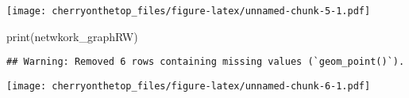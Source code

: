 \documentclass[
]{article}
\newenvironment{Shaded}{\begin{snugshade}}{\end{snugshade}}
\newcommand{\FunctionTok}[1]{\textcolor[rgb]{0.00,0.00,0.00}{#1}}
\newcommand{\NormalTok}[1]{#1}
\begin{document}
\texttt{[image: cherryonthetop\_files/figure-latex/unnamed-chunk-5-1.pdf]}

\begin{Shaded}
\begin{Highlighting}[]
\FunctionTok{print}\NormalTok{(netwkork\_graphRW)}
\end{Highlighting}
\end{Shaded}

\begin{verbatim}
## Warning: Removed 6 rows containing missing values (`geom_point()`).
\end{verbatim}

\texttt{[image: cherryonthetop\_files/figure-latex/unnamed-chunk-6-1.pdf]}
\end{document}

